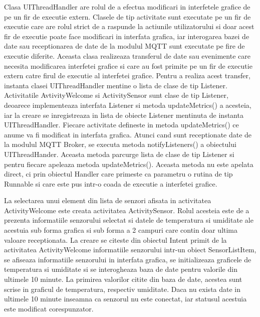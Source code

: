 Clasa UIThreadHandler are rolul de a efectua modificari in interfetele grafice de pe un fir de executie extern. Clasele de tip activitate sunt executate pe un fir de executie 
care are rolul strict de a raspunde la actiunile utilizatorului si doar acest fir de executie poate face modificari in interfata grafica, iar interogarea bazei de date sau 
receptionarea de date de la modulul MQTT sunt executate pe fire de executie diferite. Aceasta clasa realizeaza transferul de date sau evenimente care necesita modificarea 
interfetei grafice si care au fost primite pe un fir de executie extern catre firul de executie al interfetei grafice. Pentru a realiza acest transfer, instanta clasei  
UIThreadHandler mentine o lista de clase de tip Listener. Activitatile AvtivityWelcome si ActivitySensor sunt clase de tip Listener, deoarece implementeaza interfata 
Listener si metoda updateMetrics() a acesteia, iar la creare se inregistreaza in lista de obiecte Listener mentinuta de instanta UIThreadHandler. Fiecare activitate 
defineste in metoda updateMetrics() ce anume va fi modificat in interfata grafica. Atunci cand sunt receptionate date de la modulul MQTT Broker, se executa metoda 
notifyListeners() a obiectului UIThreadHander. Aceasta metoda parcurge lista de clase de tip Listener si pentru fiecare apeleaza metoda updateMetrics(). Aceasta metoda nu este 
apelata direct, ci prin obiectul Handler care primeste ca parametru o rutina de tip Runnable si care este pus intr-o coada de executie a interfetei grafice.

La selectarea unui element din lista de senzori afisata in activitatea ActivityWelcome este creata activitatea ActivitySensor. Rolul acesteia este de a prezenta informatiile 
senzorului selectat si datele de temperatura si umiditate ale acestuia sub forma grafica si sub forma a 2 campuri care contin doar ultima valoare receptionata. La creare 
se citeste din obiectul Intent primit de la activitatea ActivityWelcome informatiile senzorului intr-un obiect SensorListItem, se afiseaza informatiile senzorului in 
interfata grafica, se initializeaza graficele de temperatura si umiditate si se interogheaza baza de date pentru valorile din ultimele 10 minute. La primirea valorilor 
citite din baza de date, acestea sunt scrise in graficul de temperatura, respectiv umiditate. Daca nu exista date in ultimele 10 minute inseamna ca senzorul nu este conectat, iar 
statusul acestuia este modificat corespunzator. 

